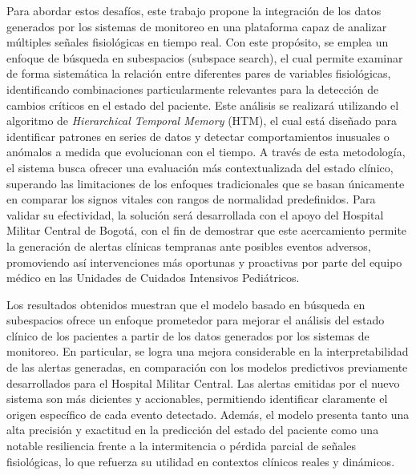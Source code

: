 Para abordar estos desafíos, este trabajo propone la integración de los datos generados por los sistemas de monitoreo en una plataforma capaz de analizar múltiples señales fisiológicas en tiempo real. Con este propósito, se emplea un enfoque de búsqueda en subespacios (subspace search), el cual permite examinar de forma sistemática la relación entre diferentes pares de variables fisiológicas, identificando combinaciones particularmente relevantes para la detección de cambios críticos en el estado del paciente. Este análisis se realizará utilizando el algoritmo de \textit{Hierarchical Temporal Memory} (HTM), el cual está diseñado para identificar patrones en series de datos y detectar comportamientos inusuales o anómalos a medida que evolucionan con el tiempo. A través de esta metodología, el sistema busca ofrecer una evaluación más contextualizada del estado clínico, superando las limitaciones de los enfoques tradicionales que se basan únicamente en comparar los signos vitales con rangos de normalidad predefinidos. Para validar su efectividad, la solución será desarrollada con el apoyo del Hospital Militar Central de Bogotá, con el fin de demostrar que este acercamiento permite la generación de alertas clínicas tempranas ante posibles eventos adversos, promoviendo así intervenciones más oportunas y proactivas por parte del equipo médico en las Unidades de Cuidados Intensivos Pediátricos.

Los resultados obtenidos muestran que el modelo basado en búsqueda en subespacios ofrece un enfoque prometedor para mejorar el análisis del estado clínico de los pacientes a partir de los datos generados por los sistemas de monitoreo. En particular, se logra una mejora considerable en la interpretabilidad de las alertas generadas, en comparación con los modelos predictivos previamente desarrollados para el Hospital Militar Central. Las alertas emitidas por el nuevo sistema son más dicientes y accionables, permitiendo identificar claramente el origen específico de cada evento detectado. Además, el modelo presenta tanto una alta precisión y exactitud en la predicción del estado del paciente como una notable resiliencia frente a la intermitencia o pérdida parcial de señales fisiológicas, lo que refuerza su utilidad en contextos clínicos reales y dinámicos.